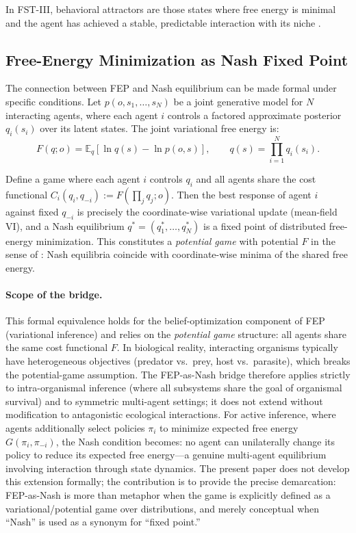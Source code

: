 \documentclass[12pt,a4paper]{article}
\theoremstyle{remark}
\begin{document}
In FST-III, behavioral attractors are those states where free energy is minimal and the agent has achieved a stable, predictable interaction with its niche \citep{FristonFreeEnergy}.

\subsection{Free-Energy Minimization as Nash Fixed Point}

The connection between FEP and Nash equilibrium can be made formal under specific conditions. Let $p(o,s_1,\dots,s_N)$ be a joint generative model for $N$ interacting agents, where each agent $i$ controls a factored approximate posterior $q_i(s_i)$ over its latent states. The joint variational free energy is:
\begin{equation}
F(q; o) = \mathbb{E}_q\!\left[\ln q(s) - \ln p(o, s)\right], \qquad q(s) = \prod_{i=1}^{N} q_i(s_i).
\end{equation}

Define a game where each agent $i$ controls $q_i$ and all agents share the cost functional $C_i(q_i, q_{-i}) := F(\prod_j q_j; o)$. Then the best response of agent $i$ against fixed $q_{-i}$ is precisely the coordinate-wise variational update (mean-field VI), and a Nash equilibrium $q^* = (q_1^*, \dots, q_N^*)$ is a fixed point of distributed free-energy minimization. This constitutes a \emph{potential game} with potential $F$ in the sense of \citet{MondererShapley1996}: Nash equilibria coincide with coordinate-wise minima of the shared free energy.

\paragraph{Scope of the bridge.} This formal equivalence holds for the belief-optimization component of FEP (variational inference) and relies on the \emph{potential game} structure: all agents share the same cost functional $F$. In biological reality, interacting organisms typically have heterogeneous objectives (predator vs.\ prey, host vs.\ parasite), which breaks the potential-game assumption. The FEP-as-Nash bridge therefore applies strictly to intra-organismal inference (where all subsystems share the goal of organismal survival) and to symmetric multi-agent settings; it does not extend without modification to antagonistic ecological interactions. For active inference, where agents additionally select policies $\pi_i$ to minimize expected free energy $G(\pi_i, \pi_{-i})$, the Nash condition becomes: no agent can unilaterally change its policy to reduce its expected free energy---a genuine multi-agent equilibrium involving interaction through state dynamics. The present paper does not develop this extension formally; the contribution is to provide the precise demarcation: FEP-as-Nash is more than metaphor when the game is explicitly defined as a variational/potential game over distributions, and merely conceptual when ``Nash'' is used as a synonym for ``fixed point.''
\end{document}
